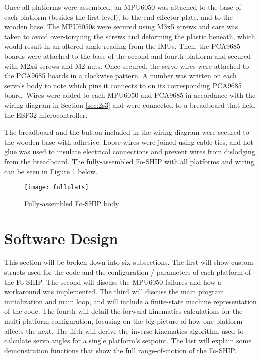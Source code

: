 \documentclass[11pt]{ucthesisCP}
\begin{document}
Once all platforms were assembled, an MPU6050 was attached to the base of each platform (besides the first level), to the end effector plate, and to the wooden base. The MPU6050s were secured using M3x5 screws and care was taken to avoid over-torquing the screws and deforming the plastic beneath, which would result in an altered angle reading from the IMUs. Then, the PCA9685 boards were attached to the base of the second and fourth platform and secured with M2x4 screws and M2 nuts. Once secured, the servo wires were attached to the PCA9685 boards in a clockwise pattern. A number was written on each servo’s body to note which pins it connects to on its corresponding PCA9685 board. Wires were added to each MPU6050 and PCA9685 in accordance with the wiring diagram in Section \ref{sec:2s3} and were connected to a breadboard that held the ESP32 microcontroller. 

The breadboard and the button included in the wiring diagram were secured to the wooden base with adhesive. Loose wires were joined using cable ties, and hot glue was used to insulate electrical connections and prevent wires from dislodging from the breadboard. The fully-assembled Fo-SHIP with all platforms and wiring can be seen in Figure \ref{fig:fullplats} below.

\begin{figure}[htbp]
	\centering
	\texttt{[image: fullplats]}
	\caption{Fully-assembled Fo-SHIP body}
	\label{fig:fullplats}
\end{figure}

\vspace{10pt}
\section{Software Design} \label{sec:2s5}
This section will be broken down into six subsections. The first will show custom structs used for the code and the configuration / parameters of each platform of the Fo-SHIP. The second will discuss the MPU6050 failures and how a workaround was implemented. The third will discuss the main program initialization and main loop, and will include a finite-state machine representation of the code. The fourth will detail the forward kinematics calculations for the multi-platform configuration, focusing on the big-picture of how one platform affects the next. The fifth will derive the inverse kinematics algorithm used to calculate servo angles for a single platform’s setpoint. The last will explain some demonstration functions that show the full range-of-motion of the Fo-SHIP.
\end{document}
